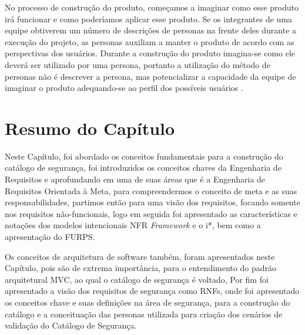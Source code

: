 No processo de construção do produto, começamos a imaginar como esse produto irá funcionar e como poderíamos aplicar esse produto\cite{soegaard2012encyclopedia}. Se os integrantes de uma equipe obtiverem um número de descrições de personas na frente deles durante a execução do projeto, as personas auxiliam a manter o produto de acordo com as perspectivas dos usuários. Durante a construção do produto imagina-se como ele deverá ser utilizado por uma persona, portanto a utilização do método de personas não é descrever a persona, mas potencializar a capacidade da equipe de imaginar o produto adequando-se ao perfil dos possíveis usuários \cite{soegaard2012encyclopedia}.  


\section{Resumo do Capítulo}

Neste Capítulo, foi abordado os conceitos fundamentais para a construção do catálogo de segurança, foi introduzidos os conceitos chaves da Engenharia de Requisitos e aprofundando em uma de suas áreas que é a Engenharia de Requisitos Orientada à Meta, para compreendermos o conceito de meta e as suas responsabilidades, partimos então para uma visão dos requisitos, focando somente nos requisitos não-funcionais, logo em seguida foi apresentado as características e notações dos modelos intencionais NFR \textit{Framework} e o i*, bem como a apresentação do FURPS. 

Os conceitos de arquitetura de software também, foram apresentados neste Capítulo, pois são de extrema importância, para o entendimento do padrão arquitetural MVC, ao qual o catálogo de segurança é voltado, Por fim foi apresentado a visão dos requisitos de segurança como RNFs, onde foi apresentado os conceitos chave e suas definições na área de segurança, para a construção do catálogo e a conceituação das personas utilizada para criação dos cenários de validação do Catálogo de Segurança. 




